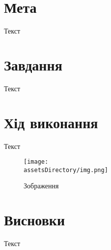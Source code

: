 \section{Мета}
Текст


\section{Завдання}
Текст


\section{Хід виконання}
Текст
\begin{figure}[h!]
    \centering
    \texttt{[image: \\assetsDirectory/img.png]}
    \caption{Зображення}
    \label{fig:img}
\end{figure}


\section{Висновки}
Текст
